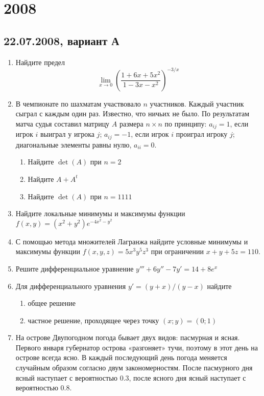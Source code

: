 \documentclass[pdftex,12pt,a4paper]{article}
\begin{document}
\section{2008}

\subsection{22.07.2008, вариант А}
\begin{enumerate}
\item  Найдите предел 
\begin{equation}
\lim_{x\to 0} \left(\frac{1+6x+5x^2}{1-3x-x^2} \right)^{-3/x}
\end{equation}
\item В чемпионате по шахматам участвовало $n$ участников. Каждый участник сыграл с каждым один раз. Известно, что ничьих не было. По результатам матча судья составил матрицу $A$ размера $n\times n$ по принципу: $a_{ij}=1$, если игрок $i$ выиграл у игрока $j$; $a_{ij}=-1$, если игрок $i$ проиграл игроку $j$; диагональные элементы равны нулю, $a_{ii}=0$.
\begin{enumerate}
\item Найдите $\det(A)$ при $n=2$
\item Найдите $A+A^{t}$
\item Найдите $\det(A)$ при $n=1111$
\end{enumerate}
\item Найдите локальные минимумы и максимумы функции $f(x,y)=(x^2+y^2)e^{-4x^2-y^2}$
\item С помощью метода множителей Лагранжа найдите условные минимумы и максимумы функции $f(x,y,z)=5x^3y^5z^3$ при ограничении $x+y+5z=110$.
\item Решите дифференциальное уравнение $y'''+6y''-7y'=14+8e^{x}$
\item Для дифференциального уравнения $y'=(y+x)/(y-x)$ найдите
\begin{enumerate}
\item общее решение
\item частное решение, проходящее через точку $(x;y)=(0;1)$
\end{enumerate}
\item На острове Двупогодном погода бывает двух видов: пасмурная и ясная. Первого января губернатор острова «разгоняет»  тучи, поэтому в этот день на острове всегда ясно. В каждый последующий день погода меняется случайным образом согласно двум закономерностям. После пасмурного дня ясный наступает с  вероятностью 0.3, после ясного дня ясный наступает с вероятностью 0.8. 

\end{enumerate}
\end{document}
